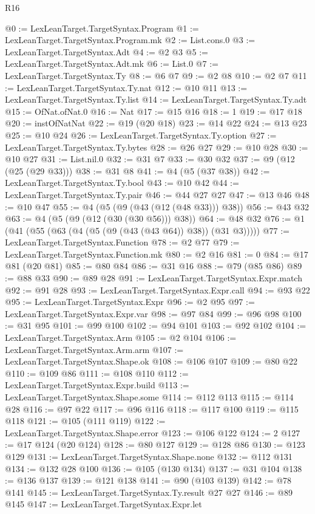 \begin{lexlean}{R16}
\begin{coremodule}
@0 := LexLeanTarget.TargetSyntax.Program
@1 := LexLeanTarget.TargetSyntax.Program.mk
@2 := List.cons.{0}
@3 := LexLeanTarget.TargetSyntax.Adt
@4 := @2 @3
@5 := LexLeanTarget.TargetSyntax.Adt.mk
@6 := List.{0}
@7 := LexLeanTarget.TargetSyntax.Ty
@8 := @6 @7
@9 := @2 @8
@10 := @2 @7
@11 := LexLeanTarget.TargetSyntax.Ty.nat
@12 := @10 @11
@13 := LexLeanTarget.TargetSyntax.Ty.list
@14 := LexLeanTarget.TargetSyntax.Ty.adt
@15 := OfNat.ofNat.{0}
@16 := Nat
@17 := @15 @16
@18 := 1
@19 := @17 @18
@20 := instOfNatNat
@22 := @19 (@20 @18)
@23 := @14 @22
@24 := @13 @23
@25 := @10 @24
@26 := LexLeanTarget.TargetSyntax.Ty.option
@27 := LexLeanTarget.TargetSyntax.Ty.bytes
@28 := @26 @27
@29 := @10 @28
@30 := @10 @27
@31 := List.nil.{0}
@32 := @31 @7
@33 := @30 @32
@37 := @9 (@12 (@25 (@29 @33)))
@38 := @31 @8
@41 := @4 (@5 (@37 @38))
@42 := LexLeanTarget.TargetSyntax.Ty.bool
@43 := @10 @42
@44 := LexLeanTarget.TargetSyntax.Ty.pair
@46 := @44 @27 @27
@47 := @13 @46
@48 := @10 @47
@55 := @4 (@5 (@9 (@43 (@12 (@48 @33))) @38))
@56 := @43 @32
@63 := @4 (@5 (@9 (@12 (@30 (@30 @56))) @38))
@64 := @48 @32
@76 := @1 (@41 (@55 (@63 (@4 (@5 (@9 (@43 (@43 @64)) @38)) (@31 @3)))))
@77 := LexLeanTarget.TargetSyntax.Function
@78 := @2 @77
@79 := LexLeanTarget.TargetSyntax.Function.mk
@80 := @2 @16
@81 := 0
@84 := @17 @81 (@20 @81)
@85 := @80 @84
@86 := @31 @16
@88 := @79 (@85 @86)
@89 := @88 @33
@90 := @89 @28
@91 := LexLeanTarget.TargetSyntax.Expr.match
@92 := @91 @28
@93 := LexLeanTarget.TargetSyntax.Expr.call
@94 := @93 @22
@95 := LexLeanTarget.TargetSyntax.Expr
@96 := @2 @95
@97 := LexLeanTarget.TargetSyntax.Expr.var
@98 := @97 @84
@99 := @96 @98
@100 := @31 @95
@101 := @99 @100
@102 := @94 @101
@103 := @92 @102
@104 := LexLeanTarget.TargetSyntax.Arm
@105 := @2 @104
@106 := LexLeanTarget.TargetSyntax.Arm.arm
@107 := LexLeanTarget.TargetSyntax.Shape.ok
@108 := @106 @107
@109 := @80 @22
@110 := @109 @86
@111 := @108 @110
@112 := LexLeanTarget.TargetSyntax.Expr.build
@113 := LexLeanTarget.TargetSyntax.Shape.some
@114 := @112 @113
@115 := @114 @28
@116 := @97 @22
@117 := @96 @116
@118 := @117 @100
@119 := @115 @118
@121 := @105 (@111 @119)
@122 := LexLeanTarget.TargetSyntax.Shape.error
@123 := @106 @122
@124 := 2
@127 := @17 @124 (@20 @124)
@128 := @80 @127
@129 := @128 @86
@130 := @123 @129
@131 := LexLeanTarget.TargetSyntax.Shape.none
@132 := @112 @131
@134 := @132 @28 @100
@136 := @105 (@130 @134)
@137 := @31 @104
@138 := @136 @137
@139 := @121 @138
@141 := @90 (@103 @139)
@142 := @78 @141
@145 := LexLeanTarget.TargetSyntax.Ty.result @27 @27
@146 := @89 @145
@147 := LexLeanTarget.TargetSyntax.Expr.let

\end{coremodule}
\end{lexlean}
